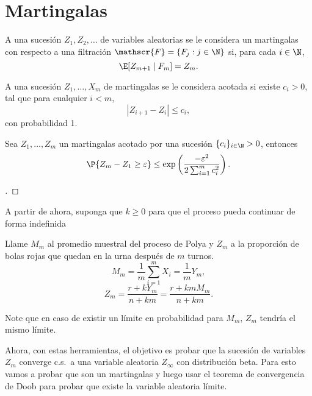 \section{Martingalas}

\begin{definition}
    A una sucesión $Z_1,Z_2,\ldots$ de variables aleatorias se le considera un martingalas con respecto a una filtración $\mathscr{F} = \{F_j : j \in \N\}$ si, para cada $i\in\N$,
    \[ \E [Z_{m+1} \;|\; F_m] = Z_m. \]
\end{definition}

\begin{definition}
    A una sucesión $Z_1,\ldots, X_m$ de martingalas se le considera acotada si existe $c_i > 0$, tal que para cualquier $i < m$,
    \[ |Z_{i+1} - Z_i| \leq c_i, \]
    con probabilidad 1.
\end{definition}

\begin{theorem} Sea $Z_1,\ldots, Z_m$ un martingalas acotado por una sucesión $\{c_i\}_{i\in\N}>0$, entonces
    \[ \P\{Z_m - Z_1 \geq \varepsilon\} \leq \exp\left( \frac{-\varepsilon^2}{2\sum_{i = 1}^m c_i^2} \right). \]    
\end{theorem}

\begin{proof}[]
    \vspace*{-2em}
\end{proof}

A partir de ahora, suponga que $k \geq 0$ para que el proceso pueda continuar de forma indefinida

\begin{definition} Llame $M_m$ al promedio muestral del proceso de Polya y $Z_m$ a la proporción de bolas rojas que quedan en la urna después de $m$ turnos.
    \[ M_m = \frac{1}{m} \sum_{i = 1}^m  X_i = \frac{1}{m} Y_m,\]
    \[ Z_m = \frac{r+kY_m}{n+km} = \frac{r+ km M_m}{n+km}. \]
\end{definition}

Note que en caso de existir un límite en probabilidad para $M_m$, $Z_m$ tendría el mismo límite.

Ahora, con estas herramientas, el objetivo es probar que la sucesión de variables $Z_m$ converge c.s.~a una variable aleatoria $Z_\infty$ con distribución beta. Para esto vamos a probar que son un martingalas y luego usar el teorema de convergencia de Doob para probar que existe la variable aleatoria límite.

